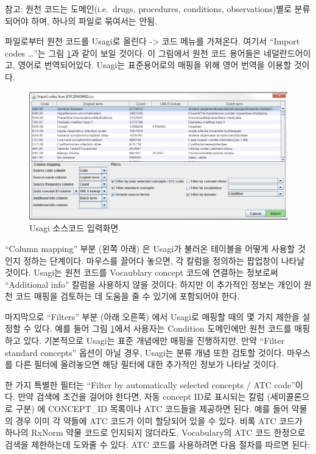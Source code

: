 \documentclass[11pt]{book}
\theoremstyle{definition}
\theoremstyle{definition}
\theoremstyle{definition}
\theoremstyle{remark}
\begin{document}
참고: 원천 코드는 도메인(i.e.~drugs, procedures, conditions,
observations)별로 분류되어야 하며, 하나의 파일로 묶여서는 안됨.

파일로부터 원천 코드를 Usagi로 올린다 -\textgreater{} 코드 메뉴를
가져온다. 여기서 ``Import codes \ldots{}''는 그림
\ref{fig:usagiImport}과 같이 보일 것이다. 이 그림에서 원천 코드 용어들은
네덜란드어이고, 영어로 번역되어있다. Usagi는 표준용어로의 매핑을 위해
영어 번역을 이용할 것이다.

\begin{figure}

{\centering \includegraphics[width=1\linewidth]{images/ExtractTransformLoad/usagiImport} 

}

\caption{Usagi 소스코드 입력화면.}\label{fig:usagiImport}
\end{figure}

``Column mapping'' 부분 (왼쪽 아래) 은 Usagi가 불러온 테이블을 어떻게
사용할 것인지 정하는 단계이다. 마우스를 끌어다 놓으면, 각 칼럼을
정의하는 팝업창이 나타날 것이다. Usagi는 원천 코드를 Vocaublary concept
코드에 연결하는 정보로써 ``Additional info'' 칼럼을 사용하지 않을
것이다; 하지만 이 추가적인 정보는 개인이 원천 코드 매핑을 검토하는 데
도움을 줄 수 있기에 포함되어야 한다.

마지막으로 ``Filters'' 부분 (아래 오른쪽) 에서 Usagi로 매핑할 때의 몇
가지 제한을 설정할 수 있다. 예를 들어 그림 \ref{fig:usagiImport}에서
사용자는 Condition 도메인에만 원천 코드를 매핑하고 있다. 기본적으로
Usagi는 표준 개념에만 매핑을 진행하지만, 만약 ``Filter standard
concepts'' 옵션이 아닐 경우, Usagi는 분류 개념 또한 검토할 것이다.
마우스를 다른 필터에 올려놓으면 해당 필터에 대한 추가적인 정보가 나타날
것이다.

한 가지 특별한 필터는 ``Filter by automatically selected concepts / ATC
code''이다. 만약 검색에 조건을 걸어야 한다면, 자동 concept ID로 표시되는
칼럼 (세미콜론으로 구분) 에 CONCEPT\_ID 목록이나 ATC 코드들을 제공하면
된다. 예를 들어 약물의 경우 이미 각 약들에 ATC 코드가 이미 할당되어 있을
수 있다. 비록 ATC 코드가 하나의 RxNorm 약물 코드로 인지되지 않더라도,
Vocabulary의 ATC 코드 한정으로 검색을 제한하는데 도와줄 수 있다. ATC
코드를 사용하려면 다음 절차를 따르면 된다:
\end{document}
